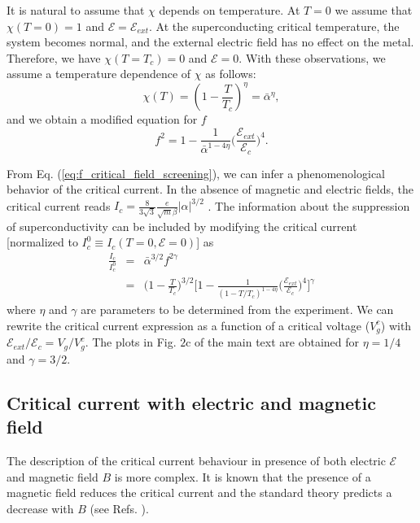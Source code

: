 \documentclass[prl,twocolumn,reprint,graphicx,showpacs,superscriptaddress,floatfix]{revtex4-1}
\newcommand{\mathE}{\mathcal{E} }
\begin{document}
It is natural to assume that $\chi$ depends on temperature.
At $T=0$ we assume that $\chi(T=0)=1$ and $\mathE = \mathE_{ext}$.
At the superconducting critical temperature, the system becomes normal, and the external electric field has no effect on the metal. Therefore, we have $\chi(T=T_c)=0$ and $\mathE = 0$.
With these observations, we assume a temperature dependence of $\chi$ as follows:
\begin{equation}
 \chi(T) = \left( 1- \frac{T}{T_c} \right)^\eta = \bar{\alpha}^\eta,
 \label{eq:chi}
\end{equation}
and we obtain a modified equation for $f$
\begin{equation}
f^2 =  1- \frac{1}{\bar{\alpha}^{1-4 \eta}}\Big( \frac{\mathE_{ext}}{\mathE_c}\Big)^4. 
\label{eq:f_critical_field_screening}
\end{equation}


From Eq. (\ref{eq:f_critical_field_screening}), we can infer a phenomenological behavior of the critical current.
In the absence of magnetic and electric fields, the critical current reads  $I_c = \frac{8}{3 \sqrt{3}} \frac{e}{\sqrt{m} \beta} |\alpha|^{3/2}$ \cite{degennes_SI, Tinkham1_SI}. 
The information about the suppression of superconductivity can be included by modifying the critical current [normalized to $I_c^0 \equiv I_c(T=0, \mathE= 0)$] as
\begin{eqnarray}
 \frac{ I_c}{I_c^0 } &=&  \bar{\alpha}^{3/2} f^{2\gamma}
 \nonumber \\
 &=& \Big(1-\frac{T}{T_c}\Big)^{3/2} \Big [ 1- \frac{1}{(1-T/T_c)^{1- 4 \eta}} \Big( \frac{\mathE_{ext}}{\mathE_c}\Big)^4 \Big ]^\gamma
  \label{eq:phenomenological_jc}
\end{eqnarray}
where $\eta$ and $\gamma$ are parameters to be determined from the experiment. 
We can rewrite the critical current expression as a function of a critical voltage ($V_g^c$) with $\mathE_{ext}/\mathE_c  = V_g/V_g^c$.
The plots in Fig. $2$c of the main text are obtained for $\eta=1/4$ and $\gamma = 3/2$.



\subsection{Critical current with electric and magnetic field}

The description of the critical current behaviour in presence of both electric $\mathcal{E}$ and magnetic field $B$ is more complex.
It is known  that the presence of a magnetic field reduces the critical current and the standard theory predicts a decrease with $B$ (see Refs. \cite{Bardeen1962_SI,Mydosh1965_SI, degennes_SI, schmidt1997physics_SI, Tinkham1_SI}).
\end{document}
